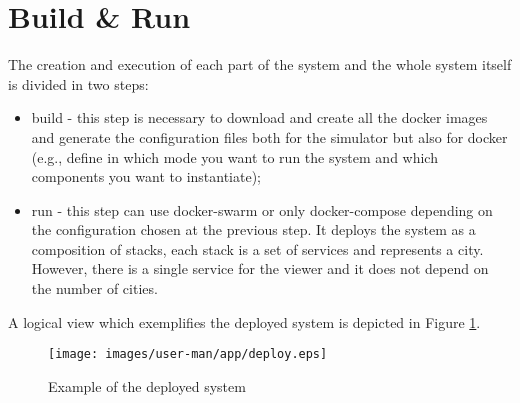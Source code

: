 \section{Build \& Run}
The creation and execution of each part of the system and
the whole system itself is divided in two steps:

\begin{itemize}
   \item build - this step is necessary to download and create all the docker
   images and generate the configuration files both for the simulator but
   also for docker (e.g., define in which mode you want to run the system and
   which components you want to instantiate);
   \item run - this step can use docker-swarm or only docker-compose depending
   on the configuration chosen at the previous step. It deploys the system
   as a composition of stacks, each stack is a set of services and represents
   a city. However, there is a single service for the viewer and it does not
   depend on the number of cities.
\end{itemize}

A logical view which exemplifies the deployed system is depicted in Figure
\ref{fig:deploy-sys}.

\begin{figure}[H]
\centering
\texttt{[image: images/user-man/app/deploy.eps]}
\caption{Example of the deployed system}
\label{fig:deploy-sys}
\end{figure}